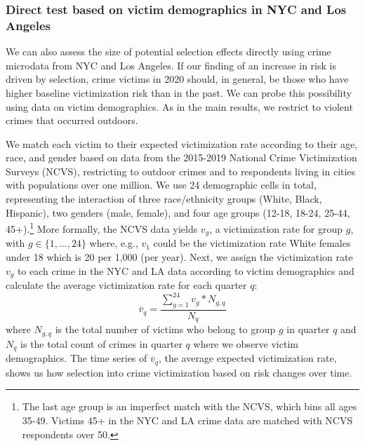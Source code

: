 \newpage 
\subsubsection{Direct test based on victim demographics in NYC and Los Angeles} \label{selection2}


We can also assess the size of potential selection effects directly using crime microdata from NYC and Los Angeles. If our finding of an increase in risk is driven by selection, crime victims in 2020 should, in general, be those who have higher baseline victimization risk than in the past. We can probe this possibility using data on victim demographics. As in the main results, we restrict to violent crimes that occurred outdoors.

We match each victim to their expected victimization rate according to their age, race, and gender based on data from the 2015-2019 National Crime Victimization Surveys (NCVS), restricting to outdoor crimes and to respondents living in cities with populations over one million. We use 24 demographic cells in total, representing the interaction of three race/ethnicity groups (White, Black, Hispanic), two genders (male, female), and four age groups (12-18, 18-24, 25-44, 45+).\footnote{The last age group is an imperfect match with the NCVS, which bins all ages 35-49. Victims 45+ in the NYC and LA crime data are matched with NCVS respondents over 50.} More formally, the NCVS data yields $v_g$, a victimization rate for group $g$, with $g \in \{ 1,...,24\}$ where, e.g., $v_1$ could be the victimization rate White females under 18 which is 20 per 1,000 (per year). Next, we assign the victimization rate $v_g$ to each crime in the NYC and LA data according to victim demographics and calculate the average victimization rate for each quarter $q$:
\begin{equation}
\overline{v}_q = \frac{ \sum_{g=1}^{24} v_g * N_{g,q}}{N_q}
\end{equation}
where  $N_{g,q}$ is the total number of victims who belong to group $g$ in quarter $q$ and $N_q$ is the total count of crimes in quarter $q$ where we observe victim demographics. The time series of $\overline{v}_q$, the average expected victimization rate, shows us how selection into crime victimization based on risk changes over time.

